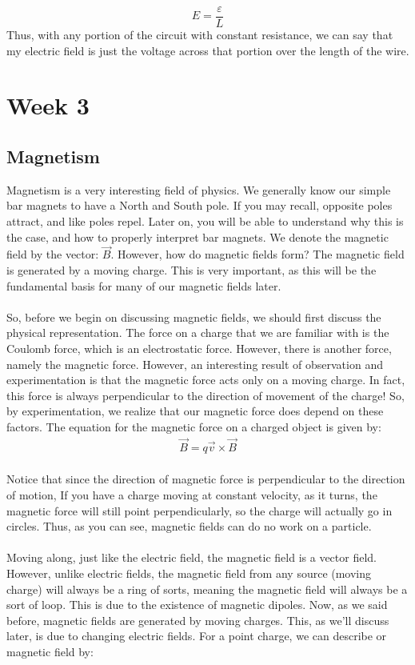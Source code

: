 \documentclass{article}
\begin{document}
$$E = \frac{\varepsilon}{L}$$
Thus, with any portion of the circuit with constant resistance, we can say that my electric field is just the voltage across that portion over the length of the wire. 

\pagebreak

\section{Week 3}
\subsection{Magnetism}
Magnetism is a very interesting field of physics. We generally know our simple bar magnets to have a North and South pole. If you may recall, opposite poles attract, and like poles repel. Later on, you will be able to understand why this is the case, and how to properly interpret bar magnets. We denote the magnetic field by the vector: $\vec{B}$. However, how do magnetic fields form? The magnetic field is generated by a moving charge. This is very important, as this will be the fundamental basis for many of our magnetic fields later. \\
\\
So, before we begin on discussing magnetic fields, we should first discuss the physical representation. The force on a charge that we are familiar with is the Coulomb force, which is an electrostatic force. However, there is another force, namely the magnetic force. However, an interesting result of observation and experimentation is that the magnetic force acts only on a moving charge. In fact, this force is always perpendicular to the direction of movement of the charge! So, by experimentation, we realize that our magnetic force does depend on these factors. The equation for the magnetic force on a charged object is given by:
\begin{align*}
\vec{B} = q\vec{v}\times\vec{B}
\end{align*}
\\
Notice that since the direction of magnetic force is perpendicular to the direction of motion, If you have a charge moving at constant velocity, as it turns, the magnetic force will still point perpendicularly, so the charge will actually go in circles. Thus, as you can see, magnetic fields can do no work on a particle. \\
\\
Moving along, just like the electric field, the magnetic field is a vector field. However, unlike electric fields, the magnetic field from any source (moving charge) will always be a ring of sorts, meaning the magnetic field will always be a sort of loop. This is due to the existence of magnetic dipoles. Now, as we said before, magnetic fields are generated by moving charges. This, as we'll discuss later, is due to changing electric fields. For a point charge, we can describe or magnetic field by:
\end{document}
